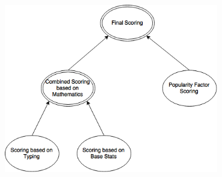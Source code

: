 \documentclass{article}
\begin{document}
\begin{center}
	\includegraphics[width=0.7\textwidth]{ScoringDiagram.png}
\end{center}
\end{document}
